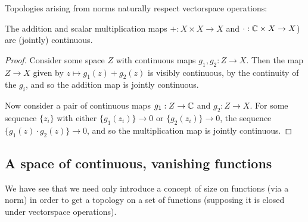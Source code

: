       Topologies arising from norms naturally respect vectorspace operations:
      \begin{claim}
        The addition and scalar multiplication maps $+:X\times X\rightarrow X$ and $\cdot:\mathbb{C}\times X\rightarrow X$) are (jointly) continuous\footnotemark.
      \end{claim}
      \begin{proof}
        Consider some space $Z$ with continuous maps $g_1,g_2:Z\rightarrow X$.
        Then the map $Z\rightarrow X$ given by $z\mapsto g_1(z)+g_2(z)$ is visibly continuous, by the continuity of the $g_i$, and so the addition map is jointly continuous.

        Now consider a pair of continuous maps $g_1:Z\rightarrow\mathbb{C}$ and $g_2:Z\rightarrow X$.
        For some sequence $\{z_i\}$ with either $\{g_1(z_i)\}\rightarrow 0$ or $\{g_2(z_i)\}\rightarrow 0$, the sequence $\{g_1(z)\cdot g_2(z)\}\rightarrow 0$, and so the multiplication map is jointly continuous.
      \end{proof}

      \subsection{A space of continuous, vanishing functions}

      We have see that we need only introduce a concept of size on functions (via a norm) in order to get a topology on a set of functions (supposing it is closed under vectorspace operations).

